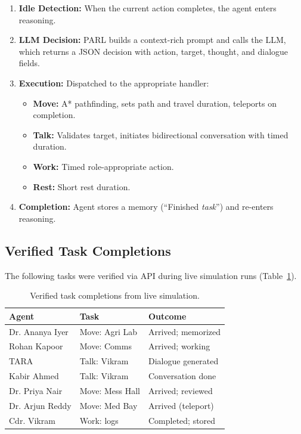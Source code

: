 \documentclass[conference]{IEEEtran}
\begin{document}
\begin{enumerate}
    \item \textbf{Idle Detection:} When the current action completes, the agent enters reasoning.
    \item \textbf{LLM Decision:} PARL builds a context-rich prompt and calls the LLM, which returns a JSON decision with action, target, thought, and dialogue fields.
    \item \textbf{Execution:} Dispatched to the appropriate handler:
    \begin{itemize}
        \item \textbf{Move:} A* pathfinding, sets path and travel duration, teleports on completion.
        \item \textbf{Talk:} Validates target, initiates bidirectional conversation with timed duration.
        \item \textbf{Work:} Timed role-appropriate action.
        \item \textbf{Rest:} Short rest duration.
    \end{itemize}
    \item \textbf{Completion:} Agent stores a memory (``Finished \textit{task}'') and re-enters reasoning.
\end{enumerate}

\subsection{Verified Task Completions}

The following tasks were verified via API during live simulation runs (Table~\ref{tab:tasks}).

\begin{table}[ht]
\centering
\caption{Verified task completions from live simulation.}
\label{tab:tasks}
\scriptsize
\begin{tabular}{@{}llp{2.0cm}@{}}
\toprule
\textbf{Agent} & \textbf{Task} & \textbf{Outcome} \\
\midrule
Dr. Ananya Iyer & Move: Agri Lab  & Arrived; memorized \\
Rohan Kapoor    & Move: Comms     & Arrived; working \\
TARA            & Talk: Vikram    & Dialogue generated \\
Kabir Ahmed     & Talk: Vikram    & Conversation done \\
Dr. Priya Nair  & Move: Mess Hall & Arrived; reviewed \\
Dr. Arjun Reddy & Move: Med Bay   & Arrived (teleport) \\
Cdr. Vikram     & Work: logs      & Completed; stored \\
\bottomrule
\end{tabular}
\end{table}
\end{document}
